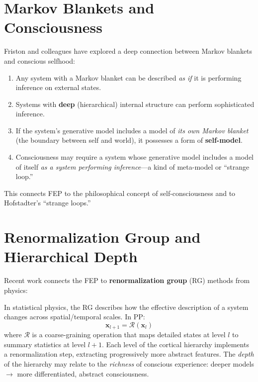 \documentclass[11pt,a4paper]{report}
\begin{document}
\section{Markov Blankets and Consciousness}

Friston and colleagues have explored a deep connection between Markov blankets and conscious selfhood:

\begin{principlebox}
\begin{enumerate}[leftmargin=1.5em]
  \item Any system with a Markov blanket can be described \emph{as if} it is performing inference on external states.
  \item Systems with \textbf{deep} (hierarchical) internal structure can perform sophisticated inference.
  \item If the system's generative model includes a model of \emph{its own Markov blanket} (the boundary between self and world), it possesses a form of \textbf{self-model}.
  \item Consciousness may require a system whose generative model includes a model of itself \emph{as a system performing inference}---a kind of meta-model or ``strange loop.''
\end{enumerate}
This connects FEP to the philosophical concept of self-consciousness and to Hofstadter's ``strange loops.''
\end{principlebox}

\section{Renormalization Group and Hierarchical Depth}

Recent work connects the FEP to \textbf{renormalization group} (RG) methods from physics:

\begin{mathbox}
\vspace{-6pt}
In statistical physics, the RG describes how the effective description of a system changes across spatial/temporal scales. In PP:
\[
  \mathbf{x}_{l+1} = \mathcal{R}(\mathbf{x}_l)
\]
where $\mathcal{R}$ is a coarse-graining operation that maps detailed states at level $l$ to summary statistics at level $l{+}1$. Each level of the cortical hierarchy implements a renormalization step, extracting progressively more abstract features. The \emph{depth} of the hierarchy may relate to the \emph{richness} of conscious experience: deeper models $\to$ more differentiated, abstract consciousness.
\vspace{-4pt}
\end{mathbox}
\end{document}
